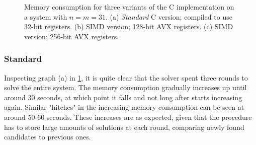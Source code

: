\begin{figure}[t]
    \centering
    \caption{Memory consumption for three variants of the C implementation on a system with $n = m = 31$. (a) \textit{Standard} C version; compiled to use 32-bit registers. (b) SIMD version; 128-bit AVX registers. (c) SIMD version; 256-bit AVX registers.} \label{fig:mem_dinur}
\end{figure}

\subsubsection{Standard}

Inspecting graph (a) in \cref{fig:mem_dinur}, it is quite clear that the solver spent three rounds to solve the entire system. The memory consumption gradually increases up until around 30 seconds, at which point it falls and not long after starts increasing again. Similar "hitches" in the increasing memory consumption can be seen at around 50-60 seconds. These increases are as expected, given that the procedure has to store large amounts of solutions at each round, comparing newly found candidates to previous ones.

